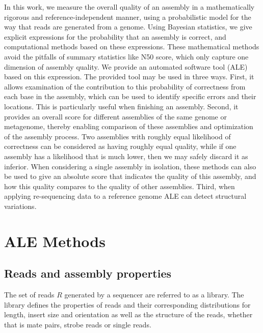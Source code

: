 \documentclass[phd,tocprelim]{cornell}
\begin{document}
In this work, we measure the overall quality of an assembly in a mathematically rigorous and reference-independent manner, using a probabilistic model for the way that reads are generated from a genome.  Using Bayesian statistics, we give explicit expressions for the probability that an assembly is correct, and computational methods based on these expressions.  These mathematical methods avoid the pitfalls of summary statistics like N50 score, which only capture one dimension of assembly quality. We provide an automated software tool (ALE) based on this expression.  The provided tool may be used in three ways.  First, it allows examination of the contribution to this probability of correctness from each base in the assembly, which can be used to identify specific errors and their locations.  This is particularly useful when finishing an assembly.  Second, it provides an overall score for different assemblies of the same genome or metagenome, thereby enabling comparison of these assemblies and optimization of the assembly process.  Two assemblies with roughly equal likelihood of correctness can be considered as having roughly equal quality, while if one assembly has a likelihood that is much lower, then we may safely discard it as inferior.  When considering a single assembly in isolation, these methods can also be used to give an absolute score that indicates the quality of this assembly, and how this quality compares to the quality of other assemblies.  Third, when applying re-sequencing data to a reference genome ALE can detect structural variations.


\chapter{ALE Methods} %
\label{cha:ALE Methods}

\section{Reads and assembly properties}

The set of reads $R$ generated by a sequencer are referred to as a library. The library defines the properties of reads and their corresponding distributions for length, insert size and orientation as well as the structure of the reads, whether that is mate pairs, strobe reads or single reads.
\end{document}
